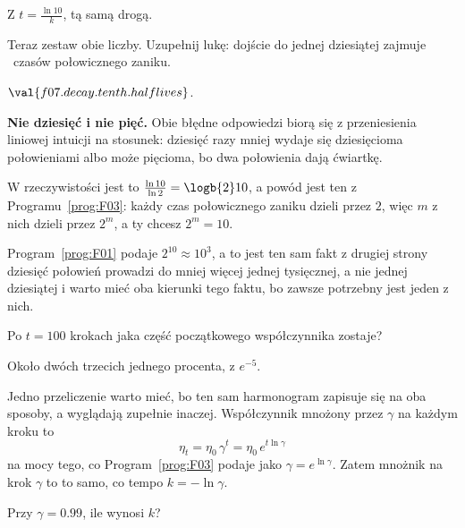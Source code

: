 \begin{fr}
Z $t = \frac{\ln 10}{k}$, tą samą drogą.

Teraz zestaw obie liczby. Uzupełnij lukę: dojście do jednej dziesiątej zajmuje
\blank\ czasów połowicznego zaniku.
\dotline
\nextframe
\end{fr}

\begin{fr}
\begin{ansblock}
$\val{f07.decay.tenth.halflives}$.
\end{ansblock}

\begin{trapbox}
\textbf{Nie dziesięć i nie pięć.} Obie błędne odpowiedzi biorą się z
przeniesienia liniowej intuicji na stosunek: dziesięć razy mniej wydaje się
dziesięcioma połowieniami albo może pięcioma, bo dwa połowienia dają ćwiartkę.

W rzeczywistości jest to $\frac{\ln 10}{\ln 2} = \logb{2} 10$, a powód jest
ten z Programu~\ref{prog:F03}: każdy czas połowicznego zaniku dzieli przez
$2$, więc $m$ z nich dzieli przez $2^{m}$, a ty chcesz $2^{m} = 10$.

Program~\ref{prog:F01} podaje $2^{10} \approx 10^{3}$, a to jest ten sam
fakt z drugiej strony \dash{} dziesięć połowień prowadzi do mniej więcej
jednej tysięcznej, a nie jednej dziesiątej \dash{} i warto mieć oba kierunki
tego faktu, bo zawsze potrzebny jest jeden z nich.
\end{trapbox}

Po $t = 100$ krokach jaka część początkowego współczynnika zostaje?
\nextframe
\end{fr}

\begin{fr}
Około dwóch trzecich jednego procenta, z $e^{-5}$.

Jedno przeliczenie warto mieć, bo ten sam harmonogram zapisuje się na oba
sposoby, a wyglądają zupełnie inaczej. Współczynnik mnożony przez $\gamma$ na
każdym kroku to
\[ \eta_t = \eta_0\,\gamma^{t} = \eta_0\,e^{t\ln\gamma} \]
na mocy tego, co Program~\ref{prog:F03} podaje jako
$\gamma = e^{\ln\gamma}$. Zatem mnożnik na krok $\gamma$ to to samo, co tempo
$k = -\ln\gamma$.

Przy $\gamma = \num{0.99}$, ile wynosi $k$?
\nextframe
\end{fr}

